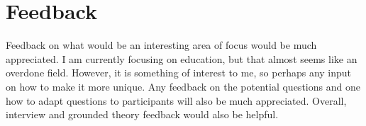 \chapter{Feedback}\label{C:feedback}

Feedback on what would be an interesting area of focus would be much appreciated. I am currently focusing on education, but that almost seems like an overdone field. However, it is something of interest to me, so perhaps any input on how to make it more unique. Any feedback on the potential questions and one how to adapt questions to participants will also be much appreciated. Overall, interview and grounded theory feedback would also be helpful. 
